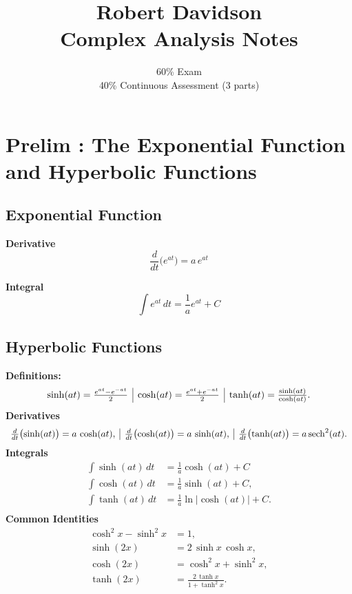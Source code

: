 \documentclass[a4paper, 10pt]{article}
\title{
Robert Davidson \\
Complex Analysis Notes
}
\author{
60\% Exam\\
40\% Continuous Assessment (3 parts)
}
\date{} %
\begin{document}
\maketitle

\tableofcontents

\pagebreak



\section{Prelim : The Exponential Function and Hyperbolic Functions}
\subsection{Exponential Function}
\noindent \begin{minipage}{0.45\textwidth}
  \textbf{Derivative}
  $$\frac{d}{dt}\bigl(e^{at}\bigr) = a\,e^{at}$$
\end{minipage}\hfill
\noindent \begin{minipage}{0.45\textwidth}
  \textbf{Integral}
  $$\int e^{at}\,dt = \frac{1}{a}e^{at} + C$$
\end{minipage}\hfill



\subsection{Hyperbolic Functions}

\textbf{Definitions:}
$$
  \begin{array}{c | c | c}
    \sinh(at) = \frac{e^{at} - e^{-at}}{2}
     &
    \cosh(at) = \frac{e^{at} + e^{-at}}{2}
     &
    \tanh(at) = \frac{\sinh(at)}{\cosh(at)}.
  \end{array}
$$
\textbf{Derivatives}
$$
  \begin{array}{c | c | c}
    \frac{d}{dt}\bigl(\sinh(at)\bigr) = a\,\cosh(at),
     &
    \frac{d}{dt}\bigl(\cosh(at)\bigr) = a\,\sinh(at),
     &
    \frac{d}{dt}\bigl(\tanh(at)\bigr) = a\,\mathrm{sech}^2(at).
  \end{array}
$$
\textbf{Integrals}
\begin{align*}
  \int \sinh(at)\,dt & = \frac{1}{a}\cosh(at) + C                 \\
  \int \cosh(at)\,dt & = \frac{1}{a}\sinh(at) + C,                \\
  \int \tanh(at)\,dt & = \frac{1}{a}\ln\bigl|\cosh(at)\bigr| + C. \\
\end{align*}
\textbf{Common Identities}
\begin{align*}
  \cosh^2 x - \sinh^2 x & = 1,                                \\
  \sinh(2x)             & = 2\,\sinh x\,\cosh x,              \\
  \cosh(2x)             & = \cosh^2 x + \sinh^2 x,            \\
  \tanh(2x)             & = \frac{2\,\tanh x}{1 + \tanh^2 x}.
\end{align*}
\end{document}

